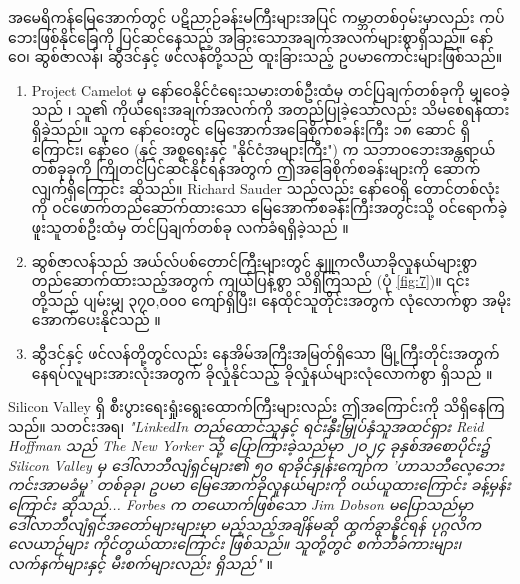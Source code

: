 \documentclass[10pt,twocolumn,letterpaper]{article}
\begin{document}
အမေရိကန်မြေအောက်တွင် ပဋိညာဉ်ခန်းမကြီးများအပြင် ကမ္ဘာတစ်ဝှမ်းမှာလည်း ကပ်ဘေးဖြစ်နိုင်ခြေကို ပြင်ဆင်နေသည့် အခြားသောအချက်အလက်များစွာရှိသည်။ နော်ဝေ၊ ဆွစ်ဇာလန်၊ ဆွီဒင်နှင့် ဖင်လန်တို့သည် ထူးခြားသည့် ဥပမာကောင်းများဖြစ်သည်။

\begin{flushleft}
\begin{enumerate}
    \item Project Camelot မှ နော်ဝေနိုင်ငံရေးသမားတစ်ဦးထံမှ တင်ပြချက်တစ်ခုကို မျှဝေခဲ့သည် \cite{25,26}၊ သူ၏ ကိုယ်ရေးအချက်အလက်ကို အတည်ပြုခဲ့သော်လည်း သိမစေရန်ထားရှိခဲ့သည်။ သူက နော်ဝေးတွင် မြေအောက်အခြေစိုက်စခန်းကြီး ၁၈ ဆောင် ရှိကြောင်း၊ နော်ဝေ (နှင့် အစ္စရေးနှင့် "နိုင်ငံအများကြီး") က သဘာဝဘေးအန္တရာယ်တစ်ခုခုကို ကြိုတင်ပြင်ဆင်နိုင်ရန်အတွက် ဤအခြေစိုက်စခန်းများကို ဆောက်လျက်ရှိကြောင်း ဆိုသည်။ Richard Sauder သည်လည်း နော်ဝေရှိ တောင်တစ်လုံးကို ဝင်ဖောက်တည်ဆောက်ထားသော မြေအောက်စခန်းကြီးအတွင်းသို့ ဝင်ရောက်ခဲ့ဖူးသူတစ်ဦးထံမှ တင်ပြချက်တစ်ခု လက်ခံရရှိခဲ့သည် \cite{22}။
    \item ဆွစ်ဇာလန်သည် အယ်လ်ပစ်တောင်ကြီးများတွင် နျူကလီယာခိုလှုနယ်များစွာ တည်ဆောက်ထားသည့်အတွက် ကျယ်ပြန့်စွာ သိရှိကြသည် (ပုံ \ref{fig:7})။ ၎င်းတို့သည် ပျမ်းမျှ ၃၇၀,၀၀၀ ကျော်ရှိပြီး၊ နေထိုင်သူတိုင်းအတွက် လုံလောက်စွာ အမိုးအောက်ပေးနိုင်သည် \cite{27}။
    \item ဆွီဒင်နှင့် ဖင်လန်တို့တွင်လည်း နေအိမ်အကြီးအမြတ်ရှိသော မြို့ကြီးတိုင်းအတွက် နေရပ်လူများအားလုံးအတွက် ခိုလှုံနိုင်သည့် ခိုလှုံနယ်များလုံလောက်စွာ ရှိသည် \cite{27}။
\end{enumerate}
\end{flushleft}

Silicon Valley ရှိ စီးပွားရေးရှုံးရွေးထောက်ကြီးများလည်း ဤအကြောင်းကို သိရှိနေကြသည်။ သတင်းအရ၊ \textit{"LinkedIn တည်ထောင်သူနှင့် ရင်းနှီးမြှုပ်နှံသူအထင်ရှား Reid Hoffman သည် The New Yorker သို့ ပြောကြားခဲ့သည်မှာ ၂၀၂၄ ခုနှစ်အစောပိုင်း၌ Silicon Valley မှ ဒေါ်လာဘီလျံရှင်များ၏ ၅၀ ရာခိုင်နှုန်းကျော်က 'ဟာသဘီလေ့ဘေးကင်းအာမခံမှု' တစ်ခုခု၊ ဥပမာ မြေအောက်ခိုလှုနယ်များကို ဝယ်ယူထားကြောင်း ခန့်မှန်းကြောင်း ဆိုသည်... Forbes က တယောက်ဖြစ်သော Jim Dobson မပြောသည်မှာ ဒေါ်လာဘီလျံရှင်အတော်များများမှာ မည့်သည့်အချိန်မဆို ထွက်ခွာနိုင်ရန် ပုဂ္ဂလိကလေယာဉ်များ ကိုင်တွယ်ထားကြောင်း ဖြစ်သည်။ သူတို့တွင် စက်ဘီခ်ကားများ၊ လက်နက်များနှင့် မီးစက်များလည်း ရှိသည်"} \cite{28}။
\end{document}
